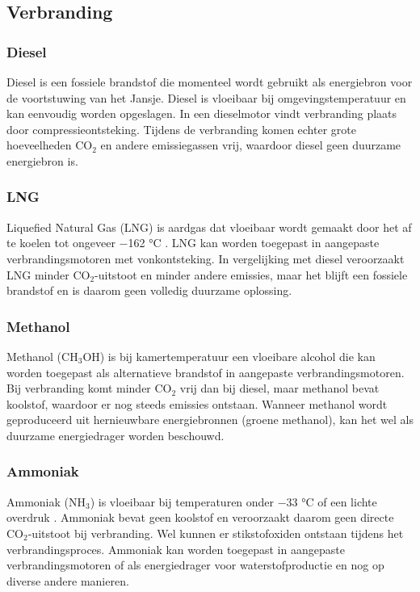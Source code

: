 \subsection*{Verbranding}

\subsubsection{\textbf{Diesel}}
Diesel is een fossiele brandstof die momenteel wordt gebruikt als energiebron voor de voortstuwing van het Jansje. Diesel is vloeibaar bij omgevingstemperatuur en kan eenvoudig worden opgeslagen. In een dieselmotor vindt verbranding plaats door compressieontsteking. Tijdens de verbranding komen echter grote hoeveelheden CO$_2$ en andere emissiegassen vrij, waardoor diesel geen duurzame energiebron is.

\subsubsection{\textbf{LNG}}
Liquefied Natural Gas (LNG) is aardgas dat vloeibaar wordt gemaakt door het af te koelen tot ongeveer −162 °C \cite{LiquefiedNaturalGasBook}. LNG kan worden toegepast in aangepaste verbrandingsmotoren met vonkontsteking. In vergelijking met diesel veroorzaakt LNG minder CO$_2$-uitstoot en minder andere emissies, maar het blijft een fossiele brandstof en is daarom geen volledig duurzame oplossing.

\subsubsection{\textbf{Methanol}}
Methanol (CH$_3$OH) is bij kamertemperatuur een vloeibare alcohol die kan worden toegepast als alternatieve brandstof in aangepaste verbrandingsmotoren. Bij verbranding komt minder CO$_2$ vrij dan bij diesel, maar methanol bevat koolstof, waardoor er nog steeds emissies ontstaan. Wanneer methanol wordt geproduceerd uit hernieuwbare energiebronnen (groene methanol), kan het wel als duurzame energiedrager worden beschouwd.

\subsubsection{\textbf{Ammoniak}}
Ammoniak (NH$_3$) is vloeibaar bij temperaturen onder −33 °C of een lichte overdruk \cite{EngineeringToolboxAmmonia}. Ammoniak bevat geen koolstof en veroorzaakt daarom geen directe CO$_2$-uitstoot bij verbranding. Wel kunnen er stikstofoxiden ontstaan tijdens het verbrandingsproces. Ammoniak kan worden toegepast in aangepaste verbrandingsmotoren of als energiedrager voor waterstofproductie en nog op diverse andere manieren.

